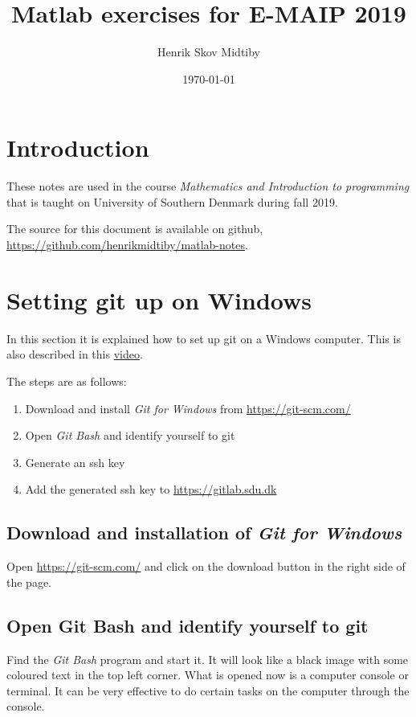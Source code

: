 \documentclass[12pt,a4paper]{article}
\author{Henrik Skov Midtiby}
\title{Matlab exercises for E-MAIP 2019}
\date{\today}
\newcounter{ex}
\numberwithin{ex}{section}
\begin{document}
\maketitle

\newpage
\tableofcontents

\newpage
\section*{Introduction}

These notes are used in the course \emph{Mathematics and Introduction to programming}
that is taught on University of Southern Denmark during fall 2019.

The source for this document is available on github, 
\url{https://github.com/henrikmidtiby/matlab-notes}.



\section{Setting git up on Windows}

In this section it is explained how to set up git on 
a Windows computer.
This is also described in this \href{https://tekvideo.sdu.dk/t/henrikmidtiby/E-MAIP-2020/2020/1/blok04/4}{video}.

The steps are as follows:
\begin{enumerate}
\item		Download and install \emph{Git for Windows} from \url{https://git-scm.com/}
\item		Open \emph{Git Bash} and identify yourself to git
\item		Generate an ssh key
\item 	Add the generated ssh key to \url{https://gitlab.sdu.dk}
\end{enumerate}

\subsection{Download and installation of \emph{Git for Windows}}

Open \url{https://git-scm.com/} and click on the download button
in the right side of the page.

\subsection{Open Git Bash and identify yourself to git}

Find the \emph{Git Bash} program and start it.
It will look like a black image with some coloured text in the 
top left corner.
What is opened now is a computer console or terminal.
It can be very effective to do certain tasks on the computer through the console.
\end{document}

